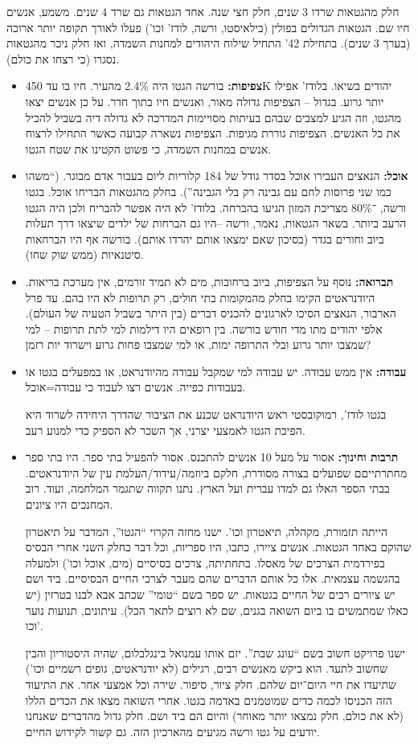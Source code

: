 \documentclass[a4paper]{book}
\begin{document}
	חלק מהגטאות שרדו 3 שנים, חלק חצי שנה. אחד הגטאות גם שרד 4 שנים. משמע, אנשים חיו שם. הגטאות הגדולים בפולין (בילאיסטו, ורשה, לודז' וכו') פעלו לאורך תקופה יותר ארוכה (בערך 3 שנים). בתחילת 42' התחיל שילוח היהודים למחנות השמדה, ואז חלק ניכר מהגטאות נסגרו (כי רצחו את כולם). 
	\begin{itemize}
		\item \textbf{צפיפות: }בורשה הגטו היה 2.4\% מהעיר. חיו בו עד 450K יהודים בשיאו. בלודז' אפילו יותר גרוע. בגדול – הצפיפות גדולה מאור, ואנשים חיו בתוך חדר. על כן אנשים יצאו מהגטו, וזה הגיע למצבים שבהם בעיתות מסויימות המדרכה לא גדולה דיה בשביל להכיל את כל האנשים. הצפיפות גוררת מגיפות. הצפיפות נשארה קבועה כאשר התחילו לרצוח אנשים במחנות השמדה, כי פשוט הקטינו את שטח הגטו. 
		\item \textbf{אוכל: }הנאצים העבירו אוכל בסדר גודל של 184 קלוריות ליום בעבור אדם מבוגר. (``משהו כמו שני פרוסות לחם עם גבינה רק בלי הגבינה''). בחלק מהגטאות הבריחו אוכל. בגטו ורשה, ־80\% מצריכת המזון הגיעו בהברחה. בלודז' לא היה אפשר להבריח ולכן היה הגטו הרעב ביותר. בשאר הגטאות, נאמר, ורשה  –היו גם הברחות של ילדים שיצאו דרך תעלות ביוב וחורים בגדר (בסיכון שאם ימצאו אותם יהרדו אותם). בורשה אף היו הברחאות סיטנאיות (ממש שוק שחו). 
		\item \textbf{תברואה: }נוסף על הצפיפות, ביוב ברחובות, מים לא תמיד זורמים, אין מערכת בריאות. היודנראטים הקימו בחלק מהמקומות בתי חולים, רק תרופות לא היו בהם. עד פרל הארבור, הנאצים הסיכו לארגונים להכניס דברים (בין היתר בשביל הטעיה של העולם). אלפי יהודים מתו מדי חודש בורשה. בין רופאים היו דילמות למי לתת תרופות – למי שמצבו יותר גרוע ובלי התרופה ימות, או למי שמצבו פחות גרוע וישרוד יות רזמן? 
		\item \textbf{עבודה: }אין ממש עבודה. יש עבודה למי שמקבל עבודה מהיודנראט, או במפעלים בגטו או בעבודות כפייה. אנשים רצו לעבוד כי עבודה=אוכל. 
		
		בגטו לודז', רמוקובסטי ראש היודנראט שכנע את הציבור שהדרך היחידה לשרוד היא הפיכת הגטו לאמצעי יצרני, אך השכר לא הספיק כדי למנוע רעב. 
		\item \textbf{תרבות וחינוך: }אסור על מעל 10 אנשים להתכנס. אסור להפעיל בתי ספר. היו בתי ספר מחתרתייםם שפועלים בצורה מסודרת, חלקם ביוזמה/עידוד/העלמת עין של היודנראטים. בבתי הספר האלו גם למדו עברית ועל הארץ. נתנו תקווה שתגמר המלחמה, ועוד. רוב המחנכים היו ציונים. 
		
		הייתה תזמורת, מקהלה, תיאטרון וכו'. ישנו מחזה הקרוי ``הגטו'', המדבר על תיאטרון שהוקם באחד הגטאות. אנשים ציירו, כתבו, היו ספריות, וכל דבר בחלק השני אחרי הבסיס בפירדמית הצרכים של מאסלו. בתחתיתה, צרכים בסיסיים (מים, אוכל וכו') ולמעלה בהגשמה עצמאית. אלו כל אותם הדברים שהם מעבר לצרכי החיים הבסיסיים. ביד ושם יש ציורים רבים של החיים בגטאות. יש ספר בשם ``טומי'' שכתב אבא לבנו בטרזין (יש כאלו שמתמשים בו ביום השואה בגנים, שם לא רוצים לתאר הכל). עיתונים, תנועות נוער וכו'. 
		
		ישנו פרויקט חשוב בשם ``עונג שבת''. יזם אותו עמנואל בינגלבלום, שהיה היסטוריון והבין שחשוב לתעד. הוא ביקש מאנשים רבים, רגילים (לא יודנראטים, גופים רשמיים וכו') שתיעדו את חיי היום־יום שלהם. חלק ציור, סיפור. שירה וכל אמצעי אחר. את התיעוד הזה הכניסו לכמה כדים שמוטמנים באדמה בגטו. אחרי השואה מצאו את הכדים הללו (לא את כולם, חלק נמצאו יותר מאוחר) והיום הם ביד ושם. חלק גדול מהדברים שאנחנו יודעים על גטו ורשה מגיעים מהארכיון הזה. גם קשור לקידוש החיים. 
	\end{itemize}
	
\end{document}
